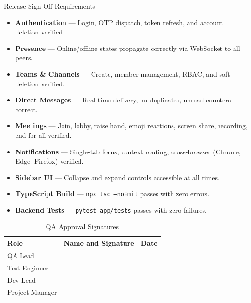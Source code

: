 \documentclass[11pt,a4paper]{report}
\begin{document}
\begin{greenbox}{Release Sign-Off Requirements}
\begin{itemize}[label=$\square$,leftmargin=1.8em,itemsep=5pt]
  \item \textbf{Authentication} --- Login, OTP dispatch, token refresh, and account deletion verified.
  \item \textbf{Presence} --- Online/offline states propagate correctly via WebSocket to all peers.
  \item \textbf{Teams \& Channels} --- Create, member management, RBAC, and soft deletion verified.
  \item \textbf{Direct Messages} --- Real-time delivery, no duplicates, unread counters correct.
  \item \textbf{Meetings} --- Join, lobby, raise hand, emoji reactions, screen share, recording, end-for-all verified.
  \item \textbf{Notifications} --- Single-tab focus, context routing, cross-browser (Chrome, Edge, Firefox) verified.
  \item \textbf{Sidebar UI} --- Collapse and expand controls accessible at all times.
  \item \textbf{TypeScript Build} --- \texttt{npx tsc --noEmit} passes with zero errors.
  \item \textbf{Backend Tests} --- \texttt{pytest app/tests} passes with zero failures.
\end{itemize}
\end{greenbox}

\vspace{1cm}

\begin{xltabular}{\textwidth}{|L{3.5cm}|X|L{3cm}|}
\caption{QA Approval Signatures} \\
\hline
{} \textbf{Role} & \textbf{Name and Signature} & \textbf{Date} \\ \hline
\endhead
QA Lead          & \hrulefill & \hrulefill \\ \hline
Test Engineer    & \hrulefill & \hrulefill \\ \hline
Dev Lead         & \hrulefill & \hrulefill \\ \hline
Project Manager  & \hrulefill & \hrulefill \\ \hline
\end{xltabular}
\end{document}
